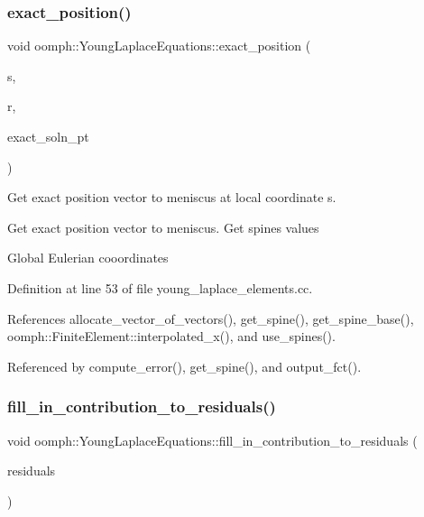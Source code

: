 \subsubsection{\texorpdfstring{exact\+\_\+position()}{exact\_position()}}
{\footnotesize\ttfamily void oomph\+::\+Young\+Laplace\+Equations\+::exact\+\_\+position (\begin{DoxyParamCaption}\item[{const \hyperlink{classoomph_1_1Vector}{Vector}$<$ double $>$ \&}]{s,  }\item[{\hyperlink{classoomph_1_1Vector}{Vector}$<$ double $>$ \&}]{r,  }\item[{\hyperlink{classoomph_1_1FiniteElement_a690fd33af26cc3e84f39bba6d5a85202}{Finite\+Element\+::\+Steady\+Exact\+Solution\+Fct\+Pt}}]{exact\+\_\+soln\+\_\+pt }\end{DoxyParamCaption})}



Get exact position vector to meniscus at local coordinate s. 

Get exact position vector to meniscus. Get spines values

Global Eulerian cooordinates 

Definition at line 53 of file young\+\_\+laplace\+\_\+elements.\+cc.



References allocate\+\_\+vector\+\_\+of\+\_\+vectors(), get\+\_\+spine(), get\+\_\+spine\+\_\+base(), oomph\+::\+Finite\+Element\+::interpolated\+\_\+x(), and use\+\_\+spines().



Referenced by compute\+\_\+error(), get\+\_\+spine(), and output\+\_\+fct().

\mbox{\label{classoomph_1_1YoungLaplaceEquations_aa28a2c9f2c9a41c9af5530d269d5deee}} 
\subsubsection{\texorpdfstring{fill\+\_\+in\+\_\+contribution\+\_\+to\+\_\+residuals()}{fill\_in\_contribution\_to\_residuals()}}
{\footnotesize\ttfamily void oomph\+::\+Young\+Laplace\+Equations\+::fill\+\_\+in\+\_\+contribution\+\_\+to\+\_\+residuals (\begin{DoxyParamCaption}\item[{\hyperlink{classoomph_1_1Vector}{Vector}$<$ double $>$ \&}]{residuals }\end{DoxyParamCaption})\hspace{0.3cm}{\ttfamily [virtual]}}




